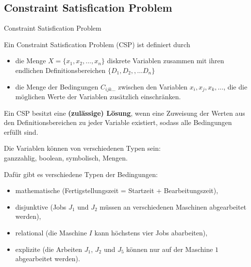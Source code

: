 \documentclass[hyperref={pdfpagelabels=false}]{beamer}
\begin{document}
\subsection{Constraint Satisfication Problem}
\begin{frame}{Constraint Satisfication Problem}
  \begin{definition}
  Ein {\color{darkred} Constraint Satisfication Problem} ({\color{darkred}CSP}) ist definiert durch\begin{itemize}
	\item  die Menge $X= \{ x_1,x_2,\dots, x_n\}$ diskrete Variablen zusammen mit ihren endlichen Definitionsbereichen $\{ D_1,D_2,,\dots D_n\}$ 
	\item die Menge der Bedingungen $C_{ijk\dots}$ zwischen den Variablen $x_i, x_j, x_k, \dots$, die die möglichen Werte der Variablen zusätzlich einschränken.
  \end{itemize}
  Ein CSP besitzt eine {\bf (zulässige) Lösung}, wenn eine Zuweisung der Werten aus den  Definitionsbereichen zu jeder Variable existiert, sodass alle Bedingungen erfüllt sind.
  \end{definition}
\end{frame}
\begin{frame}
Die Variablen können von verschiedenen Typen sein:\\ ganzzahlig, boolean, symbolisch, Mengen.
\vspace{15pt}

Dafür gibt es verschiedene Typen der Bedingungen:
\begin{itemize}
	\setlength{\itemsep}{0pt}
	\item mathematische (Fertigstellungszeit = Startzeit + Bearbeitungszeit),
	\item disjunktive (Jobs $J_1$ und $J_2$ müssen an verschiedenen Maschinen abgearbeitet werden),
	\item relational (die Maschine $I$ kann höchstens vier Jobs abarbeiten),
	\item explizite (die Arbeiten $J_1$, $J_2$ und $J_5$ können nur auf der Maschine $1$ abgearbeitet werden).
\end{itemize}
\end{frame}
\end{document}
